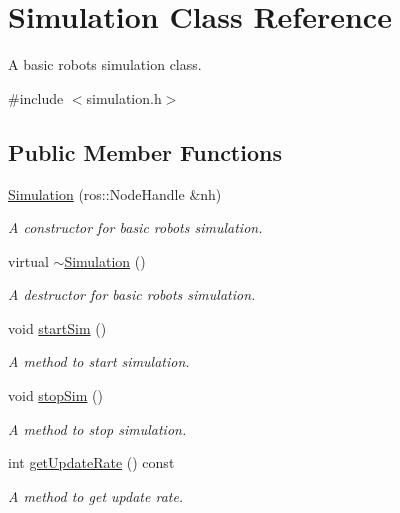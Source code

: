 \hypertarget{classSimulation}{}\section{Simulation Class Reference}
\label{classSimulation}


A basic robot\textquotesingle{}s simulation class.  




{\ttfamily \#include $<$simulation.\+h$>$}

\subsection*{Public Member Functions}
\begin{DoxyCompactItemize}
\item 
\hyperlink{classSimulation_a621e773d9c3168f63d7cb7781f21a344}{Simulation} (ros\+::\+Node\+Handle \&nh)
\begin{DoxyCompactList}\small\item\em A constructor for basic robot\textquotesingle{}s simulation. \end{DoxyCompactList}\item 
\mbox{\label{classSimulation_a80fad3f57dfaf195a36f7bc49bc88279}} 
virtual \hyperlink{classSimulation_a80fad3f57dfaf195a36f7bc49bc88279}{$\sim$\+Simulation} ()
\begin{DoxyCompactList}\small\item\em A destructor for basic robot\textquotesingle{}s simulation. \end{DoxyCompactList}\item 
\mbox{\label{classSimulation_a418b4eb171471080b9603fa2c0859b02}} 
void \hyperlink{classSimulation_a418b4eb171471080b9603fa2c0859b02}{start\+Sim} ()
\begin{DoxyCompactList}\small\item\em A method to start simulation. \end{DoxyCompactList}\item 
\mbox{\label{classSimulation_a3edaab130396016896c2ed49b6051d96}} 
void \hyperlink{classSimulation_a3edaab130396016896c2ed49b6051d96}{stop\+Sim} ()
\begin{DoxyCompactList}\small\item\em A method to stop simulation. \end{DoxyCompactList}\item 
int \hyperlink{classSimulation_a22538e804ab0fef459d1af4e1131b091}{get\+Update\+Rate} () const
\begin{DoxyCompactList}\small\item\em A method to get update rate. \end{DoxyCompactList}\end{DoxyCompactItemize}


